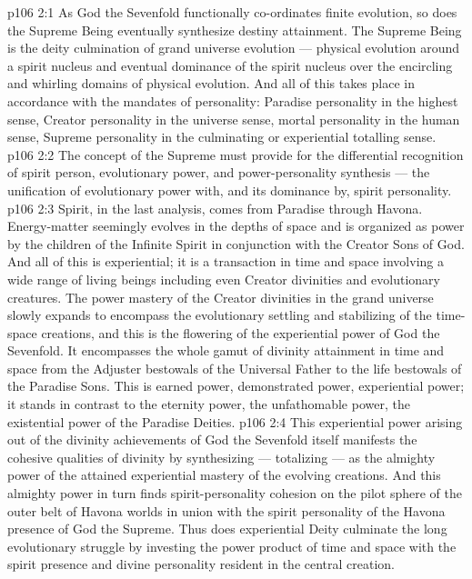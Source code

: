 \vs p106 2:1 As God the Sevenfold functionally co\hyp{}ordinates finite evolution, so does the Supreme Being eventually synthesize destiny attainment. The Supreme Being is the deity culmination of grand universe evolution --- physical evolution around a spirit nucleus and eventual dominance of the spirit nucleus over the encircling and whirling domains of physical evolution. And all of this takes place in accordance with the mandates of personality: Paradise personality in the highest sense, Creator personality in the universe sense, mortal personality in the human sense, Supreme personality in the culminating or experiential totalling sense.
\vs p106 2:2 \pc The concept of the Supreme must provide for the differential recognition of spirit person, evolutionary power, and power\hyp{}personality synthesis --- the unification of evolutionary power with, and its dominance by, spirit personality.
\vs p106 2:3 Spirit, in the last analysis, comes from Paradise through Havona. Energy\hyp{}matter seemingly evolves in the depths of space and is organized as power by the children of the Infinite Spirit in conjunction with the Creator Sons of God. And all of this is experiential; it is a transaction in time and space involving a wide range of living beings including even Creator divinities and evolutionary creatures. The power mastery of the Creator divinities in the grand universe slowly expands to encompass the evolutionary settling and stabilizing of the time\hyp{}space creations, and this is the flowering of the experiential power of God the Sevenfold. It encompasses the whole gamut of divinity attainment in time and space from the Adjuster bestowals of the Universal Father to the life bestowals of the Paradise Sons. This is earned power, demonstrated power, experiential power; it stands in contrast to the eternity power, the unfathomable power, the existential power of the Paradise Deities.
\vs p106 2:4 This experiential power arising out of the divinity achievements of God the Sevenfold itself manifests the cohesive qualities of divinity by synthesizing --- totalizing --- as the almighty power of the attained experiential mastery of the evolving creations. And this almighty power in turn finds spirit\hyp{}personality cohesion on the pilot sphere of the outer belt of Havona worlds in union with the spirit personality of the Havona presence of God the Supreme. Thus does experiential Deity culminate the long evolutionary struggle by investing the power product of time and space with the spirit presence and divine personality resident in the central creation.
